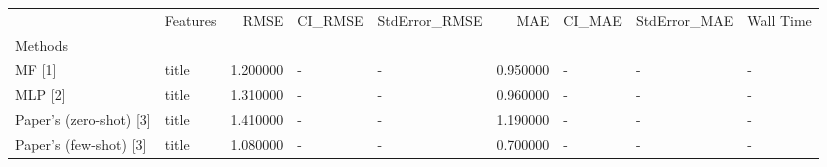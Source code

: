 \begin{tabular}{llrllrlll}
 & Features & RMSE & CI_RMSE & StdError_RMSE & MAE & CI_MAE & StdError_MAE & Wall Time \\
Methods &  &  &  &  &  &  &  &  \\
MF [1] & title & 1.200000 & - & - & 0.950000 & - & - & - \\
MLP [2] & title & 1.310000 & - & - & 0.960000 & - & - & - \\
Paper's (zero-shot) [3] & title & 1.410000 & - & - & 1.190000 & - & - & - \\
Paper's (few-shot) [3] & title & 1.080000 & - & - & 0.700000 & - & - & - \\
\end{tabular}
